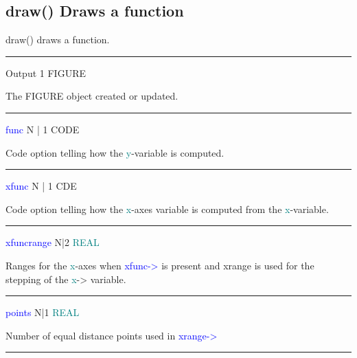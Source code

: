 \subsection{\textcolor{VioletRed}{draw}() Draws a function} 
\label{draw} 
\textcolor{VioletRed}{draw}() draws a function. 
\vspace{0.3cm} 
\hrule 
\vspace{0.3cm} 
\noindent Output  \tabto{3cm}  1 \tabto{5cm}   FIGURE  \tabto{7cm} 
\begin{changemargin}{3cm}{0cm} 
\noindent  The FIGURE object created or updated. 
\end{changemargin} 
\vspace{0.3cm} 
\hrule 
\vspace{0.3cm} 
\noindent \textcolor{blue}{func} \tabto{3cm}  N | 1  \tabto{5cm}   CODE  \tabto{7cm} 
\begin{changemargin}{3cm}{0cm} 
\noindent   Code option telling how the \textcolor{teal}{y}-variable is computed. 
\end{changemargin} 
\vspace{0.3cm} 
\hrule 
\vspace{0.3cm} 
\noindent \textcolor{blue}{xfunc} \tabto{3cm}  N | 1  \tabto{5cm}   CDE  \tabto{7cm} 
\begin{changemargin}{3cm}{0cm} 
\noindent   Code option telling how the \textcolor{teal}{x}-axes variable is computed from the \textcolor{teal}{x}-variable. 
\end{changemargin} 
\vspace{0.3cm} 
\hrule 
\vspace{0.3cm} 
\noindent \textcolor{blue}{xfuncrange}  \tabto{3cm} N|2 \tabto{5cm}   \textcolor{teal}{REAL} \tabto{7cm} 
\begin{changemargin}{3cm}{0cm} 
\noindent  Ranges for the \textcolor{teal}{x}-axes when \textcolor{blue}{xfunc->} is present and xrange is used for 
the stepping of the \textcolor{teal}{x}->  variable. 
\end{changemargin} 
\vspace{0.3cm} 
\hrule 
\vspace{0.3cm} 
\noindent \textcolor{blue}{points} \tabto{3cm} N|1 \tabto{5cm}  \textcolor{teal}{REAL} \tabto{7cm} 
\begin{changemargin}{3cm}{0cm} 
\noindent Number of equal distance points used in \textcolor{blue}{xrange->} 
\end{changemargin} 
\vspace{0.3cm} 
\hrule 
\vspace{0.3cm} 
